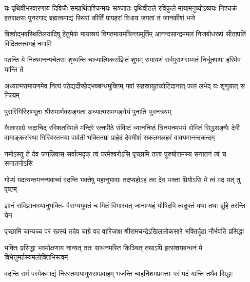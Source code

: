 

\fourlineindentedshloka
{यः पृथिवीभरवारणाय दिविजैः सम्प्रार्थितश्चिन्मयः}
{सञ्जातः पृथिवीतले रविकुले मायामनुष्योऽव्ययः}
{निश्चक्रं हतराक्षसः पुनरगाद् ब्रह्मत्वमाद्यं स्थिरां}
{कीर्तिं पापहरां विधाय जगतां तं जानकीशं भजे} %

\fourlineindentedshloka
{विश्वोद्भवस्थितिलयादिषु हेतुमेकं}
{मायाश्रयं विगतमायमचिन्त्यमूर्तिम्}
{आनन्दसान्द्रममलं निजबोधरूपं}
{सीतापतिं विदिततत्त्वमहं नमामि} %

\fourlineindentedshloka
{पठन्ति ये नित्यमनन्यचेतसः}
{शृण्वन्ति चाध्यात्मिकसंज्ञितं शुभम्}
{रामायणं सर्वपुराणसम्मतं}
{निर्धूतपापा हरिमेव यान्ति ते} %

\fourlineindentedshloka
{अध्यात्मरामायणमेव नित्यं}
{पठेद्यदीच्छेद्भवबन्धमुक्तिम्}
{गवां सहस्रायुतकोटिदानात्}
{फलं लभेद् यः शृणुयात् स नित्यम्} %

\twolineshloka
{पुरारिगिरिसम्भूता श्रीरामार्णवसङ्गता}
{अध्यात्मरामगङ्गेयं पुनाति भुवनत्रयम्} %

\fourlineindentedshloka
{कैलासाग्रे कदाचिद् रविशतविमले मन्दिरे रत्नपीठे}
{संविष्टं ध्याननिष्ठं त्रिनयनमभयं सेवितं सिद्धसङ्घैः}
{देवी वामाङ्कसंस्था गिरिवरतनया पार्वती भक्तिनम्रा}
{प्राहेदं देवमीशं सकलमलहरं वाक्यमानन्दकन्दम्} %


\fourlineindentedshloka
{नमोऽस्तु ते देव जगन्निवास}
{सर्वात्मदृक् त्वं परमेश्वरोऽसि}
{पृच्छामि तत्त्वं पुरुषोत्तमस्य}
{सनातनं त्वं च सनातनोऽसि} %

\fourlineindentedshloka
{गोप्यं यदत्यन्तमनन्यवाच्यं}
{वदन्ति भक्तेषु महानुभावाः}
{तदप्यहोऽहं तव देव भक्ता}
{प्रियोऽसि मे त्वं वद यत् तु पृष्टम्} %

\fourlineindentedshloka
{ज्ञानं सविज्ञानमथानुभक्ति-}
{वैराग्ययुक्तं च मितं विभास्वत्}
{जानाम्यहं योषिदपि त्वदुक्तं}
{यथा तथा ब्रूहि तरन्ति येन} %

\fourlineindentedshloka
{पृच्छामि चान्यच्च परं रहस्यं}
{तदेव चाग्रे वद वारिजाक्ष}
{श्रीरामचन्द्रेऽखिललोकसारे}
{भक्तिर्दृढा नौर्भवति प्रसिद्धा} %

\fourlineindentedshloka
{भक्तिः प्रसिद्धा भवमोक्षणाय}
{नान्यत् ततः साधनमस्ति किञ्चित्}
{तथाऽपि हृत्संशयबन्धनं मे}
{विभेत्तुमर्हस्यमलोक्तिभिस्त्वम्} %

\fourlineindentedshloka
{वदन्ति रामं परमेकमाद्यं}
{निरस्तमायागुणसम्प्रवाहम्}
{भजन्ति चाहर्निशमप्रमत्ताः}
{परं पदं यान्ति तथैव सिद्धाः} %


